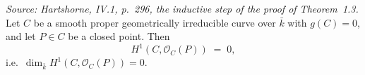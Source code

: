 \begin{lemma}



  \label{lem:H1_vanishing_lineBundleAtClosedPoint_genusZero}

  \textit{Source: Hartshorne, IV.1, p.~296, the inductive step of the
  proof of Theorem~1.3.}
  Let \(C\) be a smooth proper geometrically irreducible curve over
  \(\bar k\) with \(g(C) = 0\), and let \(P \in C\) be a closed point. Then
  \[
    H^1(C, \mathcal O_C(P)) \;=\; 0,
  \]
  i.e.\ \(\dim_{\bar k} H^1(C, \mathcal O_C(P)) = 0\).
\end{lemma}

